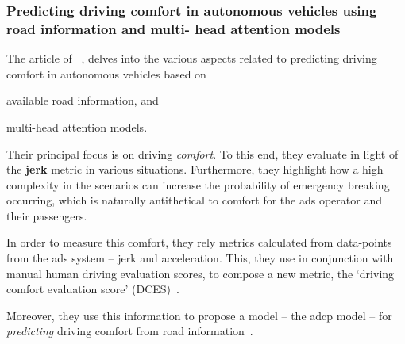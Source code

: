 \subsubsection{Predicting driving comfort in autonomous vehicles using road information and multi-
    head attention models}

The \citeyear{Chen2025} article of \citeauthor{Chen2025}~\cite{Chen2025}, delves into the various
aspects related to predicting driving comfort in autonomous vehicles based on \begin{inparaenum}
    \item available road information, and
    \item multi-head attention models.
\end{inparaenum}
Their principal focus is on driving \emph{comfort}. To this end, they evaluate  in
light of the \textbf{jerk} metric in various situations. Furthermore, they highlight how a high
complexity in the scenarios can increase the probability of emergency breaking occurring, which is
naturally antithetical to comfort for the \acrshort{ads} operator and their passengers.

In order to measure this comfort, they rely metrics calculated from data-points from the
\acrshort{ads} system -- jerk and acceleration. This, they use in conjunction with manual human
driving evaluation scores, to compose a new metric, the `driving comfort evaluation score'
(DCES)~\cite[10]{Chen2025}.

Moreover, they use this information to propose a model -- the \acrfull{adcp} model -- for
\emph{predicting} driving comfort from road information~\cite[2]{Chen2025}.
